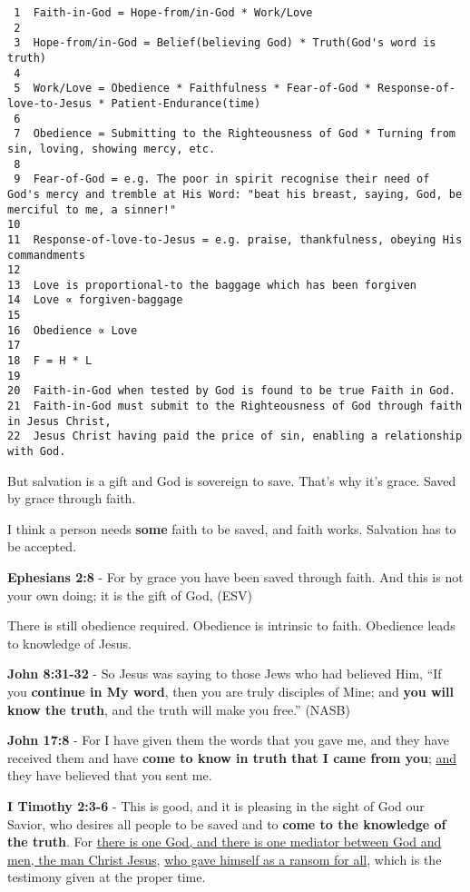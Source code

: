 \documentclass[11pt]{article}
\begin{document}
\begin{verbatim}
 1  Faith-in-God = Hope-from/in-God * Work/Love
 2  
 3  Hope-from/in-God = Belief(believing God) * Truth(God's word is truth)
 4  
 5  Work/Love = Obedience * Faithfulness * Fear-of-God * Response-of-love-to-Jesus * Patient-Endurance(time)
 6  
 7  Obedience = Submitting to the Righteousness of God * Turning from sin, loving, showing mercy, etc.
 8  
 9  Fear-of-God = e.g. The poor in spirit recognise their need of God's mercy and tremble at His Word: "beat his breast, saying, God, be merciful to me, a sinner!"
10  
11  Response-of-love-to-Jesus = e.g. praise, thankfulness, obeying His commandments
12  
13  Love is proportional-to the baggage which has been forgiven
14  Love ∝ forgiven-baggage
15  
16  Obedience ∝ Love
17  
18  F = H * L
19  
20  Faith-in-God when tested by God is found to be true Faith in God.
21  Faith-in-God must submit to the Righteousness of God through faith in Jesus Christ,
22  Jesus Christ having paid the price of sin, enabling a relationship with God.
\end{verbatim}

But salvation is a gift and God is sovereign to save.
That's why it's grace.
Saved by grace through faith.

I think a person needs \textbf{some} faith to be saved, and faith works. Salvation has to be accepted.

\textbf{Ephesians 2:8} - For by grace you have been saved through faith. And this is not your own doing; it is the gift of God, (ESV)

There is still obedience required. Obedience is intrinsic to faith. Obedience leads to knowledge of Jesus.

\textbf{John 8:31-32} - So Jesus was saying to those Jews who had believed Him, “If you \textbf{continue in My word}, then you are truly disciples of Mine; and \textbf{you will know the truth}, and the truth will make you free.” (NASB)

\textbf{John 17:8} - For I have given them the words that you gave me, and they have received them and have \textbf{come to know in truth that I came from you}; \uline{and} they have believed that you sent me.

\textbf{I Timothy 2:3-6} - This is good, and it is pleasing in the sight of God our Savior, who desires all people to be saved and to \textbf{come to the knowledge of the truth}. For \uline{there is one God, and there is one mediator between God and men, the man Christ Jesus}, \uline{who gave himself as a ransom for all}, which is the testimony given at the proper time.
\end{document}
